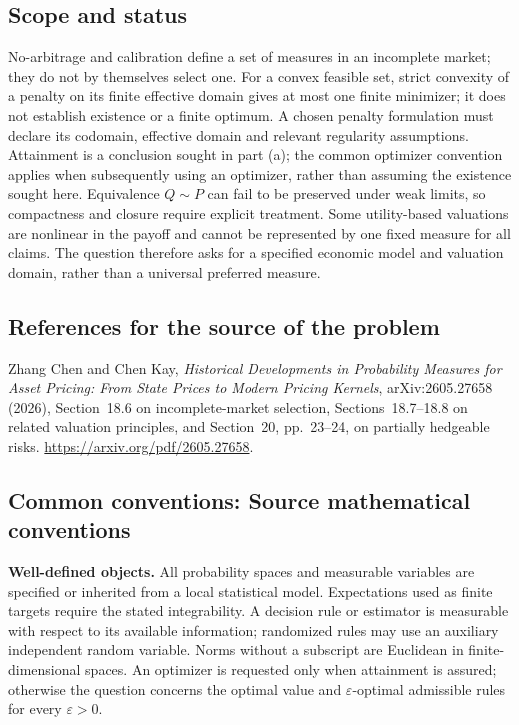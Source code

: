 \documentclass[11pt,a4paper]{article}
\begin{document}
\subsection*{Scope and status}
No-arbitrage and calibration define a set of measures in an incomplete market; they do not by themselves select one. For a convex feasible set, strict convexity of a penalty on its finite effective domain gives at most one finite minimizer; it does not establish existence or a finite optimum. A chosen penalty formulation must declare its codomain, effective domain and relevant regularity assumptions. Attainment is a conclusion sought in part (a); the common optimizer convention applies when subsequently using an optimizer, rather than assuming the existence sought here. Equivalence $Q\sim P$ can fail to be preserved under weak limits, so compactness and closure require explicit treatment. Some utility-based valuations are nonlinear in the payoff and cannot be represented by one fixed measure for all claims. The question therefore asks for a specified economic model and valuation domain, rather than a universal preferred measure.
\subsection*{References for the source of the problem}
Zhang Chen and Chen Kay, \emph{Historical Developments in Probability Measures for Asset Pricing: From State Prices to Modern Pricing Kernels}, arXiv:2605.27658 (2026), Section~18.6 on incomplete-market selection, Sections~18.7--18.8 on related valuation principles, and Section~20, pp.~23--24, on partially hedgeable risks. \url{https://arxiv.org/pdf/2605.27658}.

\subsection*{Common conventions: Source mathematical conventions}

\textbf{Well-defined objects.}
All probability spaces and measurable variables are specified or inherited
from a local statistical model. Expectations used as finite targets require
the stated integrability. A decision rule or estimator is measurable with
respect to its available information; randomized rules may use an auxiliary
independent random variable. Norms without a subscript are Euclidean in
finite-dimensional spaces. An optimizer is requested only when attainment
is assured; otherwise the question concerns the optimal value and
$\varepsilon$-optimal admissible rules for every $\varepsilon>0$.
\end{document}
